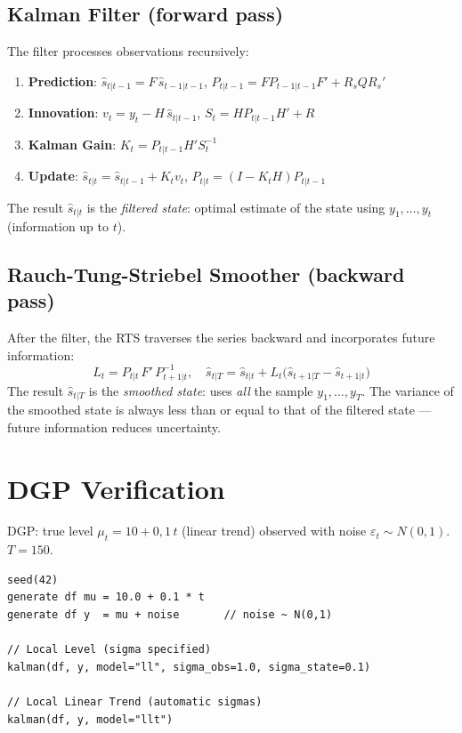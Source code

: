 \subsection*{Kalman Filter (forward pass)}

The filter processes observations recursively:

\begin{enumerate}
  \item \textbf{Prediction}: $\hat{s}_{t|t-1} = F\,\hat{s}_{t-1|t-1}$,\quad
    $P_{t|t-1} = F P_{t-1|t-1} F' + R_s Q R_s'$

  \item \textbf{Innovation}: $v_t = y_t - H\,\hat{s}_{t|t-1}$,\quad
    $S_t = H P_{t|t-1} H' + R$

  \item \textbf{Kalman Gain}: $K_t = P_{t|t-1} H' S_t^{-1}$

  \item \textbf{Update}: $\hat{s}_{t|t} = \hat{s}_{t|t-1} + K_t v_t$,\quad
    $P_{t|t} = (I - K_t H) P_{t|t-1}$
\end{enumerate}

The result $\hat{s}_{t|t}$ is the \emph{filtered state}: optimal estimate of the
state using $y_1, \ldots, y_t$ (information up to $t$).

\subsection*{Rauch-Tung-Striebel Smoother (backward pass)}

After the filter, the RTS traverses the series backward and incorporates
future information:
\[
  L_t = P_{t|t}\, F'\, P_{t+1|t}^{-1}, \quad
  \hat{s}_{t|T} = \hat{s}_{t|t} + L_t\bigl(\hat{s}_{t+1|T} - \hat{s}_{t+1|t}\bigr)
\]
The result $\hat{s}_{t|T}$ is the \emph{smoothed state}: uses \emph{all}
the sample $y_1, \ldots, y_T$. The variance of the smoothed state is always less than or equal
to that of the filtered state — future information reduces uncertainty.

\section{DGP Verification}

DGP: true level $\mu_t = 10 + 0{,}1\,t$ (linear trend) observed
with noise $\varepsilon_t \sim N(0, 1)$. $T = 150$.

\begin{lstlisting}[caption={Kalman Filter: LL and LLT}]
seed(42)
generate df mu = 10.0 + 0.1 * t
generate df y  = mu + noise       // noise ~ N(0,1)

// Local Level (sigma specified)
kalman(df, y, model="ll", sigma_obs=1.0, sigma_state=0.1)

// Local Linear Trend (automatic sigmas)
kalman(df, y, model="llt")
\end{lstlisting}

